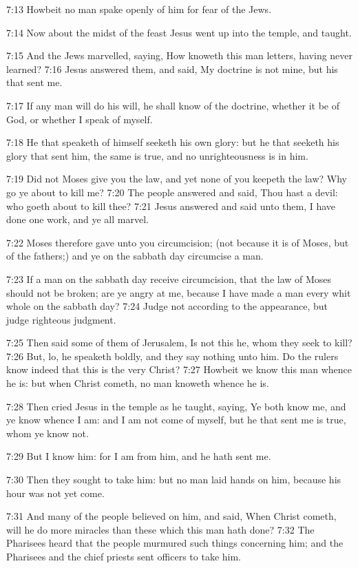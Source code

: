 7:13 Howbeit no man spake openly of him for fear of the Jews.

7:14 Now about the midst of the feast Jesus went up into the temple,
and taught.

7:15 And the Jews marvelled, saying, How knoweth this man letters,
having never learned?  7:16 Jesus answered them, and said, My doctrine
is not mine, but his that sent me.

7:17 If any man will do his will, he shall know of the doctrine,
whether it be of God, or whether I speak of myself.

7:18 He that speaketh of himself seeketh his own glory: but he that
seeketh his glory that sent him, the same is true, and no
unrighteousness is in him.

7:19 Did not Moses give you the law, and yet none of you keepeth the
law?  Why go ye about to kill me?  7:20 The people answered and said,
Thou hast a devil: who goeth about to kill thee?  7:21 Jesus answered
and said unto them, I have done one work, and ye all marvel.

7:22 Moses therefore gave unto you circumcision; (not because it is of
Moses, but of the fathers;) and ye on the sabbath day circumcise a
man.

7:23 If a man on the sabbath day receive circumcision, that the law of
Moses should not be broken; are ye angry at me, because I have made a
man every whit whole on the sabbath day?  7:24 Judge not according to
the appearance, but judge righteous judgment.

7:25 Then said some of them of Jerusalem, Is not this he, whom they
seek to kill?  7:26 But, lo, he speaketh boldly, and they say nothing
unto him. Do the rulers know indeed that this is the very Christ?
7:27 Howbeit we know this man whence he is: but when Christ cometh, no
man knoweth whence he is.

7:28 Then cried Jesus in the temple as he taught, saying, Ye both know
me, and ye know whence I am: and I am not come of myself, but he that
sent me is true, whom ye know not.

7:29 But I know him: for I am from him, and he hath sent me.

7:30 Then they sought to take him: but no man laid hands on him,
because his hour was not yet come.

7:31 And many of the people believed on him, and said, When Christ
cometh, will he do more miracles than these which this man hath done?
7:32 The Pharisees heard that the people murmured such things
concerning him; and the Pharisees and the chief priests sent officers
to take him.

